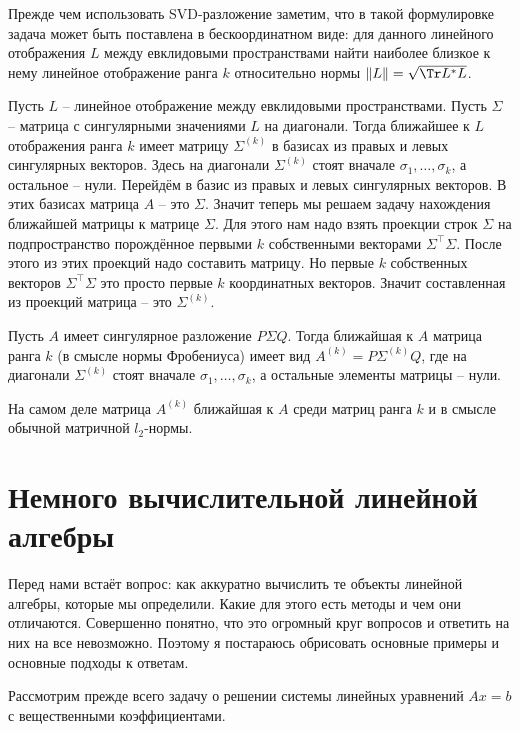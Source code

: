 Прежде чем использовать SVD-разложение заметим, что в такой формулировке задача может быть поставлена в бескоординатном виде: для данного линейного отображения $L$ между евклидовыми пространствами найти наиболее близкое к нему линейное отображение ранга $k$ относительно нормы $\|L\|=\sqrt{\Tr L^*L}$.

\thrm Пусть $L$ -- линейное отображение между евклидовыми пространствами. Пусть $\Sigma$ -- матрица с сингулярными значениями $L$ на диагонали. Тогда ближайшее к $L$ отображения ранга $k$ имеет матрицу $\Sigma^{(k)}$ в базисах из правых и левых сингулярных векторов. Здесь  на диагонали $\Sigma^{(k)}$ стоят вначале $\sigma_1,\dots,\sigma_{k}$, а остальное -- нули.
\proof Перейдём в базис из правых и левых сингулярных векторов. В этих базисах матрица $A$ -- это $\Sigma$.
Значит теперь мы решаем задачу нахождения ближайшей матрицы к матрице $\Sigma$. Для этого нам надо взять проекции строк $\Sigma$ на подпространство порождённое первыми $k$ собственными векторами $\Sigma^\top \Sigma$. После этого из этих проекций надо составить матрицу. Но первые $k$ собственных векторов $\Sigma^\top \Sigma$ это просто первые $k$ координатных векторов. Значит составленная из проекций матрица -- это $\Sigma^{(k)}$.
\endproof
\ethrm 

\crl Пусть $A$ имеет сингулярное разложение $P\Sigma Q$. Тогда ближайшая к $A$ матрица ранга $k$ (в смысле нормы Фробениуса) имеет вид $A^{(k)}=P\Sigma^{(k)}Q$, где на диагонали $\Sigma^{(k)}$ стоят вначале $\sigma_1,\dots,\sigma_{k}$, а остальные элементы матрицы -- нули.
\ecrl

\upr На самом деле матрица $A^{(k)}$ ближайшая к $A$ среди матриц ранга $k$ и в смысле обычной матричной $l_2$-нормы. 
\eupr



\section{Немного вычислительной линейной алгебры}


Перед нами встаёт вопрос: как аккуратно вычислить те объекты линейной алгебры, которые мы определили. Какие для этого есть методы и чем они отличаются. Совершенно понятно, что это огромный круг вопросов и ответить на них на все невозможно. Поэтому я постараюсь обрисовать основные примеры и основные подходы к ответам.

Рассмотрим прежде всего задачу о решении системы линейных уравнений $Ax=b$ с вещественными коэффициентами. 

